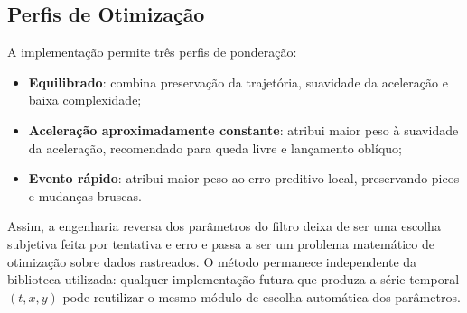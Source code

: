 \subsection{Perfis de Otimização}

A implementação permite três perfis de ponderação:

\begin{itemize}
    \item \textbf{Equilibrado}: combina preservação da trajetória, suavidade da aceleração e baixa complexidade;
    \item \textbf{Aceleração aproximadamente constante}: atribui maior peso à suavidade da aceleração, recomendado para queda livre e lançamento oblíquo;
    \item \textbf{Evento rápido}: atribui maior peso ao erro preditivo local, preservando picos e mudanças bruscas.
\end{itemize}

Assim, a engenharia reversa dos parâmetros do filtro deixa de ser uma escolha subjetiva feita por tentativa e erro e passa a ser um problema matemático de otimização sobre dados rastreados. O método permanece independente da biblioteca utilizada: qualquer implementação futura que produza a série temporal $(t,x,y)$ pode reutilizar o mesmo módulo de escolha automática dos parâmetros.
